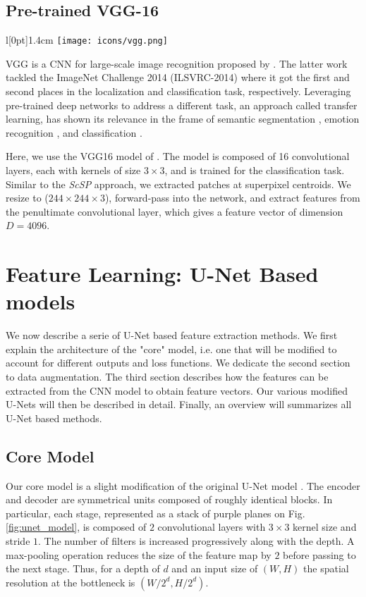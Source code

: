 \subsection{Pre-trained VGG-16} \label{vgg}
\begingroup
\setlength\intextsep{0pt}
\begin{wrapfigure}[4]{l}[0pt]{1.4cm}
\texttt{[image: icons/vgg.png]}
\end{wrapfigure}

VGG is a CNN for large-scale image recognition proposed by \cite{simonyan15}.
The latter work tackled the ImageNet \cite{ILSVRC15} Challenge 2014 (ILSVRC-2014) where it got the first and second places in the localization and classification task, respectively.
Leveraging pre-trained deep networks to address a different task, an approach called transfer learning, has shown its relevance in the frame of semantic segmentation \cite{long15}, emotion recognition \cite{ng15}, and classification \cite{huynh16}.

\endgroup

Here, we use the VGG16 model of \cite[Tab. 1]{simonyan15}.
The model is composed of 16 convolutional layers, each with kernels of size $3 \times 3$, and is trained for the classification task.
Similar to the \textit{ScSP} approach, we extracted patches at superpixel centroids.
We resize to ($244 \times 244 \times 3$), forward-pass into the network, and extract features from the penultimate convolutional layer, which gives a feature vector of dimension $D=4096$.


\section{Feature Learning: U-Net Based models} \label{ch:unet_based}
We now describe a serie of U-Net based feature extraction methods.
We first explain the architecture of the "core" model, i.e. one that will be modified to account for different outputs and loss functions.
We dedicate the second section to data augmentation.
The third section describes how the features can be extracted from the CNN model to obtain feature vectors.
Our various modified U-Nets will then be described in detail.
Finally, an overview will summarizes all U-Net based methods.

\subsection{Core Model} \label{model}
Our core model is a slight modification of the original U-Net model \cite{ronneberger15}.
The encoder and decoder are symmetrical units composed of roughly identical blocks.
In particular, each stage, represented as a stack of purple planes on Fig. \ref{fig:unet_model}, is composed of $2$ convolutional layers with $3 \times 3$ kernel size and stride $1$.
The number of filters is increased progressively along with the depth.
A max-pooling operation reduces the size of the feature map by $2$ before passing to the next stage.
Thus, for a depth of $d$ and an input size of $(W, H)$ the spatial resolution at the bottleneck is  $(W /2^d, H/2^{d})$.

